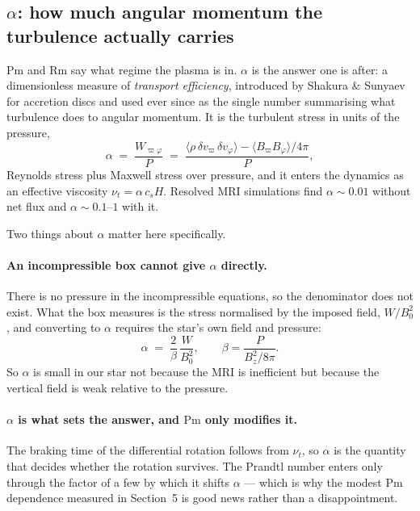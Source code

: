 \documentclass[11pt,a4paper]{article}
\newcommand{\Pm}{\mathrm{Pm}}
\newcommand{\Rm}{\mathrm{Rm}}
\begin{document}
\subsection{$\alpha$: how much angular momentum the turbulence actually carries}

$\Pm$ and $\Rm$ say what regime the plasma is in. $\alpha$ is the answer one is
after: a dimensionless measure of \emph{transport efficiency}, introduced by
Shakura \& Sunyaev for accretion discs and used ever since as the single number
summarising what turbulence does to angular momentum. It is the turbulent stress
in units of the pressure,
\begin{equation}
  \alpha \;=\; \frac{W_{\varpi\varphi}}{P}
  \;=\; \frac{\big\langle \rho\, \delta v_\varpi\, \delta v_\varphi \big\rangle
              - \big\langle B_\varpi B_\varphi \big\rangle/4\pi}{P},
\end{equation}
Reynolds stress plus Maxwell stress over pressure, and it enters the dynamics
as an effective viscosity $\nu_t = \alpha\, c_s H$. Resolved MRI simulations
find $\alpha \sim 0.01$ without net flux and $\alpha \sim 0.1$--$1$ with it.

Two things about $\alpha$ matter here specifically.

\paragraph{An incompressible box cannot give $\alpha$ directly.} There is no
pressure in the incompressible equations, so the denominator does not exist.
What the box measures is the stress normalised by the imposed field, $W/B_0^2$,
and converting to $\alpha$ requires the star's own field and pressure:
\begin{equation}
  \alpha \;=\; \frac{2}{\beta}\,\frac{W}{B_0^2},
  \qquad \beta = \frac{P}{B_z^2/8\pi}.
  \label{eq:alpha}
\end{equation}
So $\alpha$ is small in our star not because the MRI is inefficient but because
the vertical field is weak relative to the pressure.

\paragraph{$\alpha$ is what sets the answer, and $\Pm$ only modifies it.} The
braking time of the differential rotation follows from $\nu_t$, so $\alpha$ is
the quantity that decides whether the rotation survives. The Prandtl number
enters only through the factor of a few by which it shifts $\alpha$ --- which is
why the modest $\Pm$ dependence measured in Section~5 is good news rather than a
disappointment.
\end{document}
